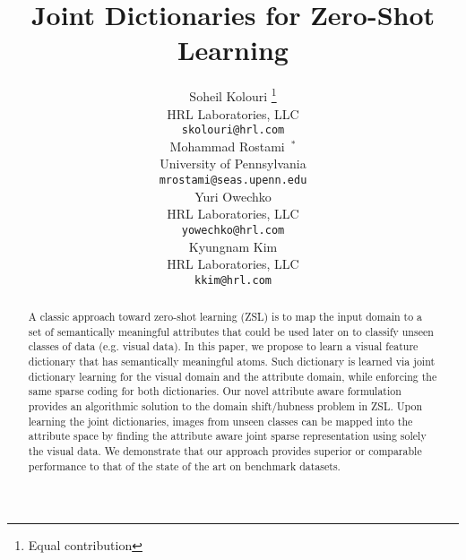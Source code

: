\documentclass[letterpaper]{article} %
\begin{document}
%
\title{ Joint Dictionaries for Zero-Shot Learning}
\author{Soheil Kolouri \thanks{Equal contribution} \\
  HRL Laboratories, LLC\\
  \texttt{\small skolouri@hrl.com} \\
  \And
  Mohammad Rostami~$^*$\\
  University of Pennsylvania\\
  \texttt{\small mrostami@seas.upenn.edu} \\
  \And 
  Yuri Owechko\\
  HRL Laboratories, LLC\\
  \texttt{\small yowechko@hrl.com} \\
  \And
  Kyungnam Kim\\
  HRL Laboratories, LLC\\
  \texttt{\small kkim@hrl.com}}
 \maketitle

\begin{abstract}

A classic approach toward zero-shot learning (ZSL) is to map the input domain to a set of semantically meaningful attributes that could be used later on to classify unseen classes of data (e.g. visual data). In this paper, we propose to learn a visual feature dictionary that has semantically meaningful atoms. Such dictionary is learned via joint dictionary learning for the visual domain and the attribute domain, while enforcing the same sparse coding for both dictionaries. Our novel attribute aware formulation provides an algorithmic solution to the domain shift/hubness problem in ZSL. Upon learning the joint dictionaries, images from unseen classes can be mapped into the attribute space by finding the attribute aware joint sparse representation using solely the visual data.  We demonstrate that our approach provides superior or comparable performance to that of the state of the art on benchmark datasets. 
\end{abstract}
\end{document}
